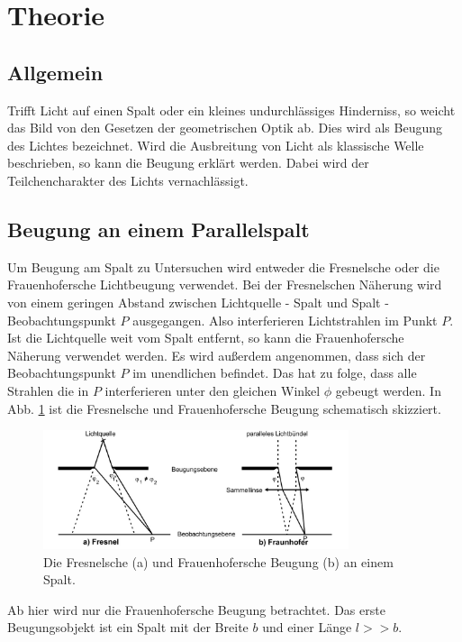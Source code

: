 \section{Theorie}
\label{sec:Theorie}
\subsection{Allgemein}
Trifft Licht auf einen Spalt oder ein kleines undurchlässiges Hinderniss, so weicht das Bild von den Gesetzen der geometrischen Optik ab.
Dies wird als Beugung des Lichtes bezeichnet.
Wird die Ausbreitung von Licht als klassische Welle beschrieben, so kann die Beugung erklärt werden.
Dabei wird der Teilchencharakter des Lichts vernachlässigt.

\subsection{Beugung an einem Parallelspalt}
Um Beugung am Spalt zu Untersuchen wird entweder die Fresnelsche oder die Frauenhofersche Lichtbeugung verwendet.
Bei der Fresnelschen Näherung wird von einem geringen Abstand zwischen Lichtquelle - Spalt und Spalt - Beobachtungspunkt $P$ ausgegangen.
Also interferieren Lichtstrahlen im Punkt $P$.
\\
Ist die Lichtquelle weit vom Spalt entfernt, so kann die Frauenhofersche Näherung verwendet werden.
Es wird außerdem angenommen, dass sich der Beobachtungspunkt $P$ im unendlichen befindet.
Das hat zu folge, dass alle Strahlen die in $P$ interferieren unter den gleichen Winkel $\phi$ gebeugt werden.
In Abb. \ref{fig:naeherung} ist die Fresnelsche und Frauenhofersche Beugung schematisch skizziert.
\begin{figure}
    \centering
    \includegraphics[width=0.8\textwidth]{content/data/naeherung.jpg}
    \caption{Die Fresnelsche (a) und Frauenhofersche Beugung (b) an einem Spalt. \cite[2]{anleitung}}
    \label{fig:naeherung}
\end{figure}
Ab hier wird nur die Frauenhofersche Beugung betrachtet.
Das erste Beugungsobjekt ist ein Spalt mit der Breite $b$ und einer Länge $l >> b$.
